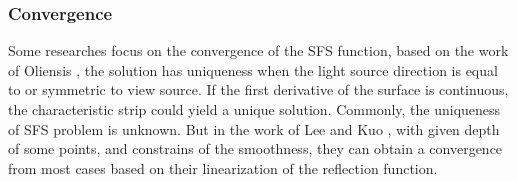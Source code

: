\subsubsection{Convergence}
Some researches focus on the convergence of the SFS function, based on the work of Oliensis \cite{oliensis1991shape} , the solution has uniqueness when the light source direction is equal to or symmetric to view source. If the first derivative of the surface is continuous, the characteristic strip could yield a unique solution. Commonly, the uniqueness of SFS problem is unknown. But in the work of Lee and Kuo \cite{lee1993shape}, with given depth of some points, and constrains of the smoothness, they can obtain a convergence from most cases based on their linearization of the reflection function. 